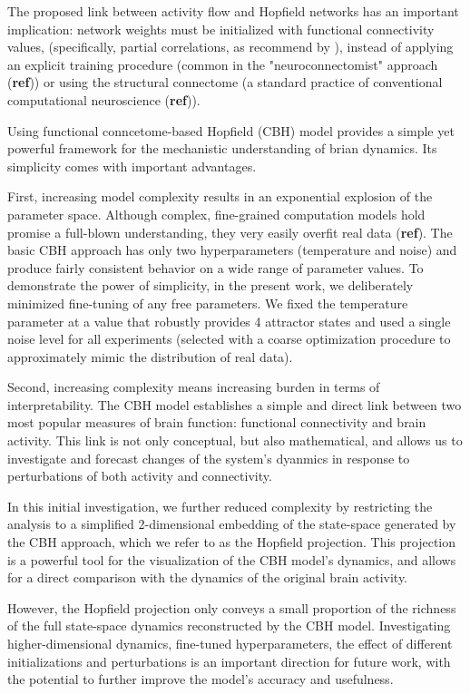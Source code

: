 \documentclass{article}
\begin{document}
The proposed link between activity flow and Hopfield networks has an important implication: network weights must be initialized with functional connectivity values, (specifically, partial correlations, as recommend by \href{https://doi.org/10.1038/nn.4406}{}), instead of applying an explicit training procedure (common in the "neuroconnectomist" approach (\textbf{ref})) or using the structural connectome (a standard practice of conventional computational neuroscience (\textbf{ref})).

Using functional conncetome-based Hopfield (CBH) model provides a simple yet powerful framework for the mechanistic understanding of brian dynamics. Its simplicity comes with important advantages.

First, increasing model complexity results in an exponential explosion of the parameter space. Although complex, fine-grained computation models hold promise a full-blown understanding, they very easily overfit real data (\textbf{ref}). The basic CBH approach has only two hyperparameters (temperature and noise) and produce fairly consistent behavior on a wide range of parameter values. To demonstrate the power of simplicity, in the present work, we deliberately minimized fine-tuning of any free parameters. We fixed the temperature parameter at a value that robustly provides 4 attractor states and used a single noise level for all experiments (selected with a coarse optimization procedure to approximately mimic the distribution of real data).

Second, increasing complexity means increasing burden in terms of interpretability. The CBH model establishes a simple and direct link between two most popular measures of brain function: functional connectivity and brain activity. This link is not only conceptual, but also mathematical, and allows us to investigate and forecast changes of the system's dyanmics in response to perturbations of both activity and connectivity.

In this initial investigation, we further reduced complexity by restricting the analysis to a simplified 2-dimensional embedding of the state-space generated by the CBH approach, which we refer to as the Hopfield projection. This projection is a powerful tool for the visualization of the CBH model's dynamics, and allows for a direct comparison with the dynamics of the original brain activity.

However, the Hopfield projection only conveys a small proportion of the richness of the full state-space dynamics reconstructed by the CBH model.
Investigating higher-dimensional dynamics, fine-tuned hyperparameters, the effect of different initializations and perturbations is an important direction for future work, with the potential to further improve the model's accuracy and usefulness.
\end{document}
